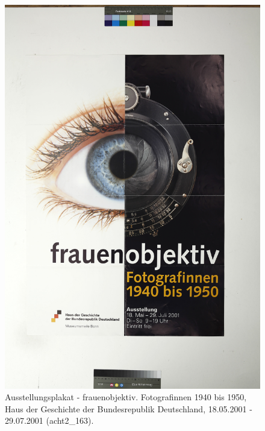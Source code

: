 \documentclass[a4paper,12pt,ngerman]{article}
\begin{document}
\newpage
\begin{figure}[ht]
\includegraphics[width=\linewidth]{Abbildung_47_(acht2_163)}
\centering
\caption{Ausstellungsplakat - frauenobjektiv. Fotografinnen 1940 bis 1950, Haus der Geschichte der Bundesrepublik Deutschland, 18.05.2001 - 29.07.2001 (acht2\_163).}
\end{figure}
\end{document}
